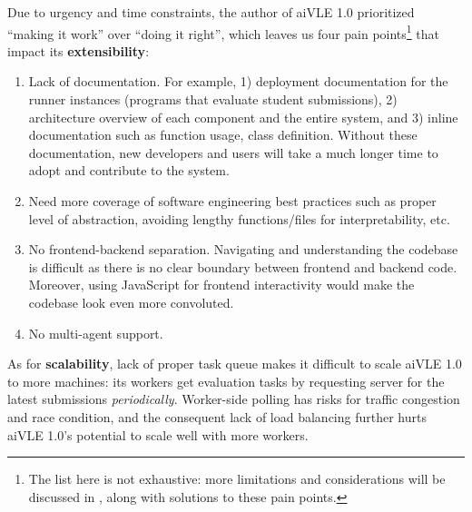 Due to urgency and time constraints, the author of aiVLE 1.0 prioritized ``making it work'' over ``doing it right'', which leaves us four pain points\footnote{The list here is not exhaustive: more limitations and considerations will be discussed in , along with solutions to these pain points.} that impact its \textbf{extensibility}:

\begin{enumerate}
    \item Lack of documentation. For example, 1) deployment documentation for the runner instances (programs that evaluate student submissions), 2) architecture overview of each component and the entire system, and 3) inline documentation such as function usage, class definition. Without these documentation, new developers and users will take a much longer time to adopt and contribute to the system. 
    \item Need more coverage of software engineering best practices such as proper level of abstraction, avoiding lengthy functions/files for interpretability, etc.
    \item No frontend-backend separation. Navigating and understanding the codebase is difficult as there is no clear boundary between frontend and backend code. Moreover, using JavaScript for frontend interactivity would make the codebase look even more convoluted.
    \item No multi-agent support.
\end{enumerate}

As for \textbf{scalability}, lack of proper task queue makes it difficult to scale aiVLE 1.0 to more machines: its workers get evaluation tasks by requesting server for the latest submissions \textit{periodically}. Worker-side polling has risks for traffic congestion and race condition, and the consequent lack of load balancing further hurts aiVLE 1.0’s potential to scale well with more workers.